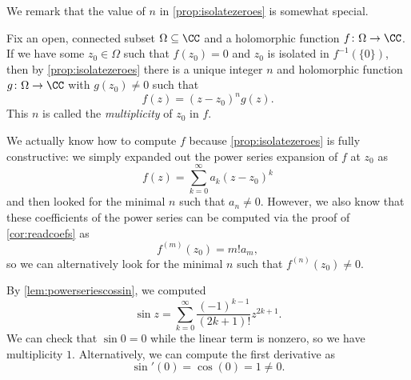 \documentclass[../notes.tex]{subfiles}
\begin{document}
We remark that the value of $n$ in \autoref{prop:isolatezeroes} is somewhat special.
\begin{definition}[Multiplicity]
	Fix an open, connected subset $\Omega\subseteq\CC$ and a holomorphic function $f\colon\Omega \to\CC$. If we have some $z_0\in\Omega$ such that $f(z_0)=0$ and $z_0$ is isolated in $f^{-1}(\{0\})$, then by \autoref{prop:isolatezeroes} there is a unique integer $n$ and holomorphic function $g\colon\Omega \to\CC$ with $g(z_0)\ne0$ such that
	\[f(z)=(z-z_0)^ng(z).\]
	This $n$ is called the \textit{multiplicity} of $z_0$ in $f$.
\end{definition}
We actually know how to compute $f$ because \autoref{prop:isolatezeroes} is fully constructive: we simply expanded out the power series expansion of $f$ at $z_0$ as
\[f(z)=\sum_{k=0}^\infty a_k(z-z_0)^k\]
and then looked for the minimal $n$ such that $a_n\ne0$. However, we also know that these coefficients of the power series can be computed via the proof of \autoref{cor:readcoefs} as
\[f^{(m)}(z_0)=m!a_m,\]
so we can alternatively look for the minimal $n$ such that $f^{(n)}(z_0)\ne0$.
\begin{example}
	By \autoref{lem:powerseriescossin}, we computed
	\[\sin z=\sum_{k=0}^\infty\frac{(-1)^{k-1}}{(2k+1)!}z^{2k+1}.\]
	We can check that $\sin0=0$ while the linear term is nonzero, so we have multiplicity $1$. Alternatively, we can compute the first derivative as
	\[\sin'(0)=\cos(0)=1\ne0.\]
\end{example}
\end{document}
